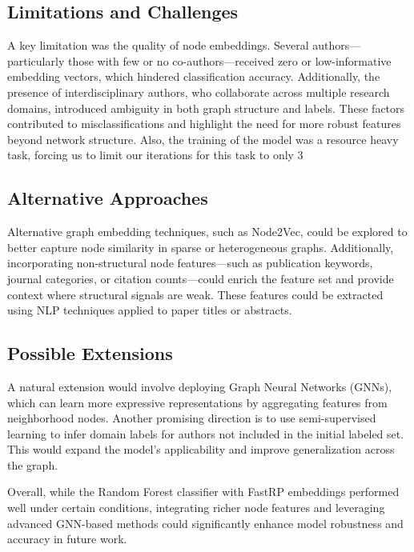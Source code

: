 \documentclass[conference, 12pt]{IEEEtran}
\begin{document}
\subsection{Limitations and Challenges}
A key limitation was the quality of node embeddings. Several authors—particularly those with few or no co-authors—received zero or low-informative embedding vectors, which hindered classification accuracy. Additionally, the presence of interdisciplinary authors, who collaborate across multiple research domains, introduced ambiguity in both graph structure and labels. These factors contributed to misclassifications and highlight the need for more robust features beyond network structure.
Also, the training of the model was a resource heavy task, forcing us to limit our iterations for this task to only 3

\subsection{Alternative Approaches}
Alternative graph embedding techniques, such as Node2Vec, could be explored to better capture node similarity in sparse or heterogeneous graphs. Additionally, incorporating non-structural node features—such as publication keywords, journal categories, or citation counts—could enrich the feature set and provide context where structural signals are weak. These features could be extracted using NLP techniques applied to paper titles or abstracts.

\subsection{Possible Extensions}
A natural extension would involve deploying Graph Neural Networks (GNNs), which can learn more expressive representations by aggregating features from neighborhood nodes. 
 Another promising direction is to use semi-supervised learning to infer domain labels for authors not included in the initial labeled set. This would expand the model’s applicability and improve generalization across the graph.

Overall, while the Random Forest classifier with FastRP embeddings performed well under certain conditions, integrating richer node features and leveraging advanced GNN-based methods could significantly enhance model robustness and accuracy in future work.



\end{document}
